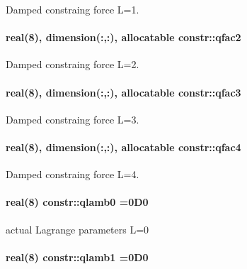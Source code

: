 Damped constraing force L=1. 

\paragraph[{\texorpdfstring{qfac2}{qfac2}}]{\setlength{\rightskip}{0pt plus 5cm}real(8), dimension(\+:,\+:), allocatable constr\+::qfac2}\hypertarget{namespaceconstr_a07ecd53eb439059f24f9da31a9261e37}{}\label{namespaceconstr_a07ecd53eb439059f24f9da31a9261e37}


Damped constraing force L=2. 

\paragraph[{\texorpdfstring{qfac3}{qfac3}}]{\setlength{\rightskip}{0pt plus 5cm}real(8), dimension(\+:,\+:), allocatable constr\+::qfac3}\hypertarget{namespaceconstr_a6ce54a1e7305b2e04c8db7e4e0b462db}{}\label{namespaceconstr_a6ce54a1e7305b2e04c8db7e4e0b462db}


Damped constraing force L=3. 

\paragraph[{\texorpdfstring{qfac4}{qfac4}}]{\setlength{\rightskip}{0pt plus 5cm}real(8), dimension(\+:,\+:), allocatable constr\+::qfac4}\hypertarget{namespaceconstr_a362515a302fb05cad337f01df7b447e1}{}\label{namespaceconstr_a362515a302fb05cad337f01df7b447e1}


Damped constraing force L=4. 

\paragraph[{\texorpdfstring{qlamb0}{qlamb0}}]{\setlength{\rightskip}{0pt plus 5cm}real(8) constr\+::qlamb0 =0\+D0}\hypertarget{namespaceconstr_a71a650091cb17d25c0fa7c8a3a013cb5}{}\label{namespaceconstr_a71a650091cb17d25c0fa7c8a3a013cb5}


actual Lagrange parameters L=0 

\paragraph[{\texorpdfstring{qlamb1}{qlamb1}}]{\setlength{\rightskip}{0pt plus 5cm}real(8) constr\+::qlamb1 =0\+D0}\hypertarget{namespaceconstr_a63e33f7b185213d983929801556d3724}{}\label{namespaceconstr_a63e33f7b185213d983929801556d3724}



